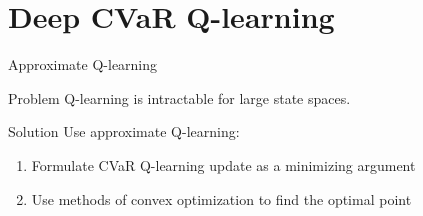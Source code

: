\documentclass{beamer}
\begin{document}
%
%


\section{Deep CVaR Q-learning}



\begin{frame}{Approximate Q-learning}
\begin{alertblock}
{Problem} Q-learning is intractable for large state spaces.
\end{alertblock}
\begin{exampleblock}
{Solution} Use approximate Q-learning:
\begin{enumerate}
\item Formulate CVaR Q-learning update as a minimizing argument
\item Use methods of convex optimization to find the optimal point
\end{enumerate}
\end{exampleblock}

\end{frame}


%
%
\end{document}
